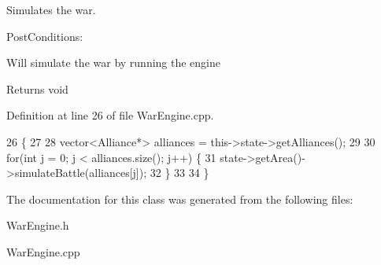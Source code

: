 Simulates the war. 

Post\+Conditions\+:
\begin{DoxyItemize}
\item Will simulate the war by running the engine
\end{DoxyItemize}

\begin{DoxyReturn}{Returns}
void 
\end{DoxyReturn}


Definition at line 26 of file War\+Engine.\+cpp.


\begin{DoxyCode}
26                          \{
27 
28     vector<Alliance*> alliances = this->state->getAlliances();
29 
30     \textcolor{keywordflow}{for}(\textcolor{keywordtype}{int} j = 0; j < alliances.size(); j++) \{
31         state->getArea()->simulateBattle(alliances[j]);
32     \}
33 
34 \}
\end{DoxyCode}


The documentation for this class was generated from the following files\+:\begin{DoxyCompactItemize}
\item 
War\+Engine.\+h\item 
War\+Engine.\+cpp\end{DoxyCompactItemize}
